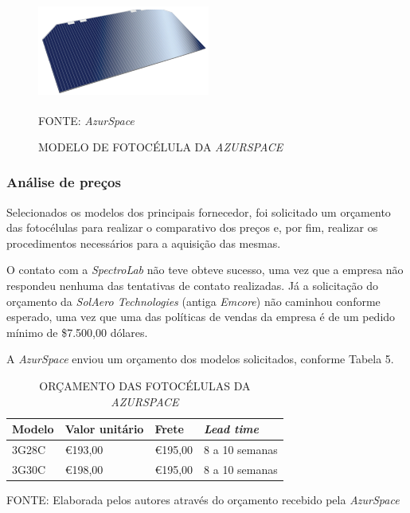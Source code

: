 \documentclass[
	12pt,				%
	openright,			%
	oneside,			%
	a4paper,			%
	english,			%
	french,				%
	spanish,			%
	brazil,				%
	oldfontcommands
	]{abntex2}
\begin{document}
	\begin{figure}[th]
		\caption{MODELO DE FOTOCÉLULA DA \textit{AZURSPACE}}
		\centering
		\includegraphics[width=0.5\linewidth]{./figs/ZTJ}
			
		\begin{small}
			FONTE: \textit{AzurSpace}\textsuperscript{\cite{AzurSpace2}}
		\end{small}		
	\end{figure}	
	\pagebreak
	
\subsubsection[Análise de preços]{Análise de preços}

	Selecionados os modelos dos principais fornecedor, foi solicitado um orçamento das fotocélulas para realizar o comparativo dos preços e, por fim, realizar os procedimentos necessários para a aquisição das mesmas.
	
	O contato com a \textit{SpectroLab} não teve obteve sucesso, uma vez que a empresa não respondeu nenhuma das tentativas de contato realizadas. Já a solicitação do orçamento da \textit{SolAero Technologies} (antiga \textit{Emcore}) não caminhou conforme esperado, uma vez que uma das políticas de vendas da empresa é de um pedido mínimo de \$7.500,00 dólares.
	
	A \textit{AzurSpace} enviou um orçamento dos modelos solicitados, conforme Tabela 5.
	
	\begin{table}[th]
	\caption{ORÇAMENTO DAS FOTOCÉLULAS DA \textit{AZURSPACE}}
	\centering
	\begin{tabular}{p{3.0cm}|p{3.0cm}|p{3.0cm}|p{3.0cm}}
		\textbf{Modelo} & \textbf{Valor unitário} & \textbf{Frete} & \textit{\textbf{Lead time}}\\
		\hline
		3G28C & \euro 193,00 & \euro 195,00 & 8 a 10 semanas\\
		3G30C & \euro 198,00 & \euro 195,00 & 8 a 10 semanas\\

	\end{tabular}
	
	\begin{small}
	\vspace{3pt}
		FONTE: Elaborada pelos autores através do orçamento recebido pela \textit{AzurSpace}
	\end{small}
	\end{table}	
	
\end{document}
